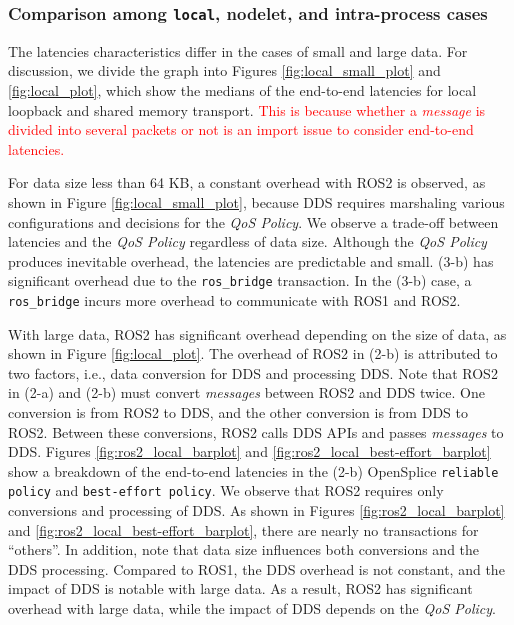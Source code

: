 \documentclass{sig-alternate-05-2015}
\begin{document}
\vspace{-3mm}
\subsubsection{Comparison among \texttt{local}, nodelet, and intra-process cases}
\label{sec:local}
The latencies characteristics differ in the cases of small and large data.
For discussion, we divide the graph into Figures \ref{fig:local_small_plot} and \ref{fig:local_plot}, which show the medians of the end-to-end latencies for local loopback and shared memory transport.
\textcolor{red}{This is because whether a \emph{message} is divided into several packets or not is an import issue to consider end-to-end latencies.}

For data size less than 64 KB, a constant overhead with ROS2 is observed, as shown in Figure \ref{fig:local_small_plot}, because DDS requires marshaling various configurations and decisions for the \emph{QoS Policy}.
We observe a trade-off between latencies and the \emph{QoS Policy} regardless of data size.
Although the \emph{QoS Policy} produces inevitable overhead, the latencies are predictable and small.
(3-b) has significant overhead due to the \texttt{ros\_bridge} transaction.
In the (3-b) case, a \texttt{ros\_bridge} incurs more overhead to communicate with ROS1 and ROS2.

With large data, ROS2 has significant overhead depending on the size of data, as shown in Figure \ref{fig:local_plot}.
The overhead of ROS2 in (2-b) is attributed to two factors, i.e., data conversion for DDS and processing DDS.
Note that ROS2 in (2-a) and (2-b) must convert \emph{messages} between ROS2 and DDS twice.
One conversion is from ROS2 to DDS, and the other conversion is from DDS to ROS2.
Between these conversions, ROS2 calls DDS APIs and passes \emph{messages} to DDS.
Figures \ref{fig:ros2_local_barplot} and \ref{fig:ros2_local_best-effort_barplot} show a breakdown of the end-to-end latencies in the (2-b) OpenSplice \texttt{reliable policy} and \texttt{best-effort policy}.
We observe that ROS2 requires only conversions and processing of DDS.
As shown in Figures \ref{fig:ros2_local_barplot} and \ref{fig:ros2_local_best-effort_barplot}, there are nearly no transactions for ``others''.
In addition, note that data size influences both conversions and the DDS processing.
Compared to ROS1, the DDS overhead is not constant, and the impact of DDS is notable with large data.
As a result, ROS2 has significant overhead with large data, while the impact of DDS depends on the \emph{QoS Policy}.
\end{document}
